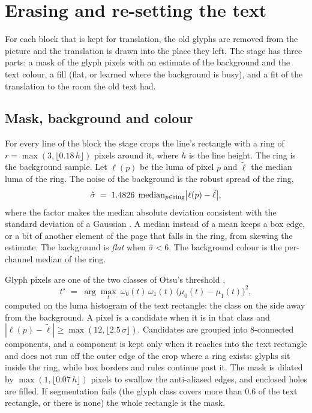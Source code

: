 \section{Erasing and re-setting the text}\label{sec:erase}

For each block that is kept for translation, the old glyphs are removed from the picture and the translation is drawn
into the place they left. The stage has three parts: a mask of the glyph pixels with an estimate of the background and the
text colour, a fill (flat, or learned where the background is busy), and a fit of the translation to the room the old text had.

\subsection{Mask, background and colour}

For every line of the block the stage crops the line's rectangle with a ring of $r=\max(3,\lfloor0.18\,h\rfloor)$ pixels around it,
where $h$ is the line height. The ring is the background sample. Let $\ell(p)$ be the luma of pixel $p$ and $\tilde\ell$ the median
luma of the ring. The noise of the background is the robust spread of the ring,
\begin{equation}\label{eq:mad}
\hat\sigma\;=\;1.4826\;\operatorname{median}_{p\in\text{ring}}\bigl|\ell(p)-\tilde\ell\bigr| ,
\end{equation}
where the factor makes the median absolute deviation consistent with the standard deviation of a Gaussian \citep{mad}. A median
instead of a mean keeps a box edge, or a bit of another element of the page that falls in the ring, from skewing the estimate.
The background is \emph{flat} when $\hat\sigma<6$. The background colour is the per-channel median of the ring.

Glyph pixels are one of the two classes of Otsu's threshold \citep{otsu},
\begin{equation}\label{eq:otsu}
t^\star\;=\;\arg\max_t\ \omega_0(t)\,\omega_1(t)\,\bigl(\mu_0(t)-\mu_1(t)\bigr)^2 ,
\end{equation}
computed on the luma histogram of the text rectangle: the class on the side away from the background. A pixel is a candidate when
it is in that class and $|\ell(p)-\tilde\ell|\ge\max(12,\lfloor2.5\,\hat\sigma\rfloor)$. Candidates are grouped into 8-connected components, and a
component is kept only when it reaches into the text rectangle and does not run off the outer edge of the crop where a ring
exists: glyphs sit inside the ring, while box borders and rules continue past it. The mask is dilated by
$\max(1,\lfloor0.07\,h\rfloor)$ pixels to swallow the anti-aliased edges, and enclosed holes are filled. If segmentation fails (the
glyph class covers more than $0.6$ of the text rectangle, or there is none) the whole rectangle is the mask.


